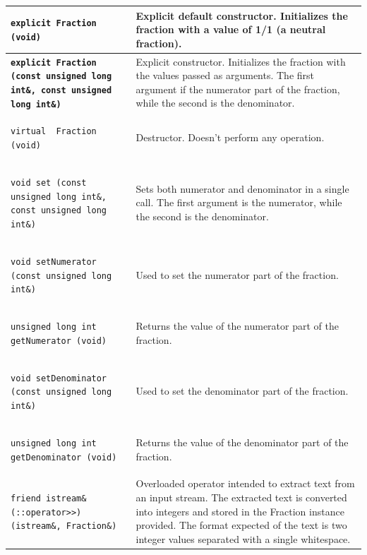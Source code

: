 \documentclass[11pt,twoside,openany,x11names,svgnames]{memoir}
\begin{document}
\begin{table}[h]\footnotesize
\centering
\begin{tabular}{| >{\bfseries}p{8cm} | p{7.5cm} |}
	\hline
	
	\texttt{explicit Fraction (void)} & Explicit default constructor. Initializes the fraction with a value of 1/1 (a neutral fraction). \\
	
	\hline
	
	\texttt{explicit Fraction (const unsigned long int\&, const unsigned long int\&)} & Explicit constructor. Initializes the fraction with the values passed as arguments. The first argument if the numerator part of the fraction, while the second is the denominator. \\
	
	\hline
	
	\texttt{virtual ~Fraction (void)} & Destructor. Doesn't perform any operation. \\
	
	\hline
	
	\texttt{void set (const unsigned long int\&, const unsigned long int\&)} & Sets both numerator and denominator in a single call. The first argument is the numerator, while the second is the denominator. \\
	
	\hline	
	
	\texttt{void setNumerator (const unsigned long int\&)} & Used to set the numerator part of the fraction. \\
	
	\hline
	
	\texttt{unsigned long int getNumerator (void)} & Returns the value of the numerator part of the fraction. \\
	
	\hline	
	
	\texttt{void setDenominator (const unsigned long int\&)} & Used to set the denominator part of the fraction. \\
	
	\hline
	
	\texttt{unsigned long int getDenominator (void)} & Returns the value of the denominator part of the fraction. \\
	
	\hline
	
	\texttt{friend istream\& (::operator>>) (istream\&, Fraction\&)} & Overloaded operator intended to extract text from an input stream. The extracted text is converted into integers and stored in the Fraction instance provided. The format expected of the text is two integer values separated with a single whitespace. \\
	

\end{tabular}
\end{table}
\end{document}
